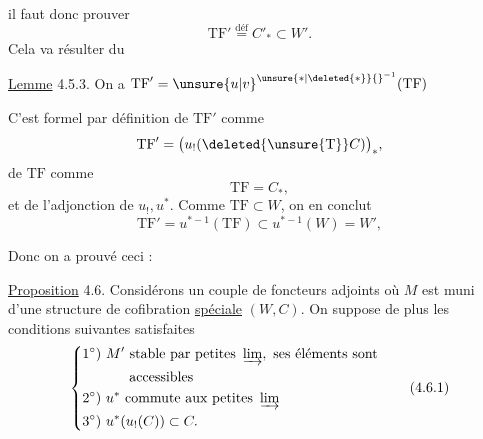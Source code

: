 
il faut donc prouver
\[
\mathrm{TF}'\overset{\mathrm{déf}}{=}C'_*\subset W'.
\]
Cela va résulter du

\uline{Lemme} 4.5.3. On a $\mathrm{TF}'=\unsure{u|v}^{\unsure{*|\deleted{*}}{}^{-1}}(\mathrm{TF})$

C'est formel par définition de $\mathrm{TF}'$ comme
\[
\mathrm{TF}'=\bigl(u_!(\deleted{\unsure{\mathrm T}}C)\bigr)_*,
\]
de $\mathrm{TF}$ comme
\[
\mathrm{TF}=C_*,
\]
et de l'adjonction de $u_!,u^*$. Comme $\mathrm{TF}\subset W$, on en conclut
\[
\mathrm{TF}'=u^{*-1}(\mathrm{TF})\subset u^{*-1}(W)=W',
\]

Donc on a prouvé ceci :

\uline{Proposition} 4.6. Considérons un couple de foncteurs adjoints
où $M$ est muni d'une structure de cofibration \uline{spéciale} $(W,C)$. On suppose de plus les conditions suivantes satisfaites
\[
\left\{\begin{aligned} 1^\circ)&\ M'\ \text{stable par petites }\varinjlim,\ \text{ses éléments sont}\\ &\qquad\text{accessibles}\\ 2^\circ)&\ u^*\ \text{commute aux petites }\varinjlim\\ 3^\circ)&\ u^*(u_!(C))\subset C.
\end{aligned}\right.\tag*{(4.6.1)}
\]
